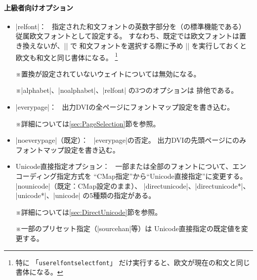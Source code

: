 \documentclass[uplatex,dvipdfmx,a4paper]{jsarticle}
\newcommand{\Pkg}[1]{\textsf{#1}}
\newcommand{\Note}{\par\noindent ※}
\newcommand{\Means}{：\ }
\providecommand{\Strong}[1]{\textsf{#1}}
\begin{document}
\paragraph{上級者向けオプション}
\begin{itemize}
\item |relfont|\Means
  指定された和文フォントの英数字部分を（{\pLaTeX}の標準機能である）
  \Strong{従属欧文フォント}として設定する。
  すなわち、既定では欧文フォントは置き換えないが、|\selectfont| で
  和文フォントを選択する際に予め |\userelfont| を実行しておくと
  欧文も和文と同じ書体になる。
  \footnote{特に
  「\texttt{userelfontselectfont}」
  だけ実行すると、欧文が現在の和文と同じ書体になる。}
  \Note 置換が設定されていないウェイトについては無効になる。
  \Note |alphabet|、|noalphabet|、|relfont| の3つのオプションは
  排他である。
\item |everypage|\Means
  出力DVIの全ページにフォントマップ設定を書き込む。
  \Note 詳細については\ref{sec:PageSelection}節を参照。
\item |noeverypage|（既定）\Means
  |everypage|の否定。
  出力DVIの先頭ページにのみフォントマップ設定を書き込む。
\item \Strong{Unicode直接指定オプション}\Means
  一部または全部のフォントについて、エンコーディング指定方式を
  “CMap指定”から“Unicode直接指定”に変更する。
  |nounicode|（既定：CMap設定のまま）、
  |directunicode|、|directunicode*|、
  |unicode*|、|unicode| の5種類の指定がある。
  \Note 詳細については\ref{sec:DirectUnicode}節を参照。
  \Note 一部のプリセット指定（|sourcehan|等）は
  Unicode直接指定の既定値を変更する。

\end{itemize}
\end{document}
